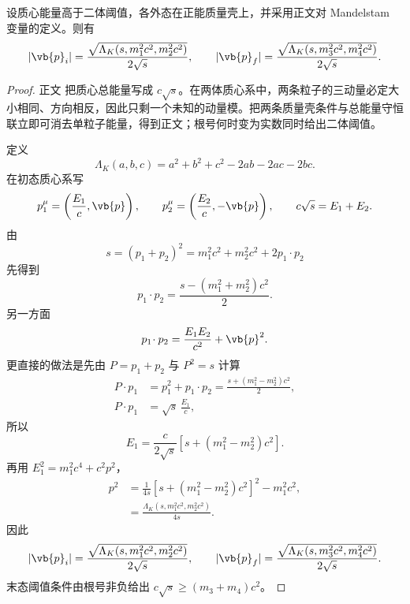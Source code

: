 \begin{proposition}
设质心能量高于二体阈值，各外态在正能质量壳上，并采用正文对 Mandelstam 变量的定义。则有
\begin{equation}
 {
 |\vb{p}_i|
 =\frac{\sqrt{\Lambda_K(s,m_1^2c^2,m_2^2c^2)}}{2\sqrt s},
 \qquad
 |\vb{p}_f|
 =\frac{\sqrt{\Lambda_K(s,m_3^2c^2,m_4^2c^2)}}{2\sqrt s}.}
\label{eq:cm-momenta-kallen-si-r9}
\end{equation}
\end{proposition}
\begin{proof}
正文 把质心总能量写成 $c\sqrt s$。在两体质心系中，两条粒子的三动量必定大小相同、方向相反，因此只剩一个未知的动量模。把两条质量壳条件与总能量守恒联立即可消去单粒子能量，得到正文；根号何时变为实数同时给出二体阈值。

定义
\begin{equation*}
 \Lambda_K(a,b,c)=a^2+b^2+c^2-2ab-2ac-2bc.
 \end{equation*}
在初态质心系写
\begin{equation*}
 p_1^\mu=\left(\frac{E_1}{c},\vb{p}\right),
 \qquad
 p_2^\mu=\left(\frac{E_2}{c},-\vb{p}\right),
 \qquad
 c\sqrt s=E_1+E_2.
\end{equation*}
由
\begin{equation*}
 s=(p_1+p_2)^2=m_1^2c^2+m_2^2c^2+2p_1\!\cdot p_2
\end{equation*}
先得到
\begin{equation*}
 p_1\!\cdot p_2
 =\frac{s-(m_1^2+m_2^2)c^2}{2}.
\end{equation*}
另一方面
\begin{equation*}
 p_1\!\cdot p_2=\frac{E_1E_2}{c^2}+\vb{p}^2.
\end{equation*}
更直接的做法是先由 $P=p_1+p_2$ 与 $P^2=s$ 计算
\begin{align*}
 P\!\cdot p_1
 &=p_1^2+p_1\!\cdot p_2
 =\frac{s+(m_1^2-m_2^2)c^2}{2},\\
 P\!\cdot p_1
 &=\sqrt s\,\frac{E_1}{c},
\end{align*}
所以
\begin{equation*}
 E_1
 =\frac{c}{2\sqrt s}
 \left[s+(m_1^2-m_2^2)c^2\right].
\end{equation*}
再用 $E_1^2=m_1^2c^4+c^2p^2$，
\begin{align*}
 p^2
 &=\frac{1}{4s}
 \left[s+(m_1^2-m_2^2)c^2\right]^2-m_1^2c^2,\\
 &=\frac{\Lambda_K(s,m_1^2c^2,m_2^2c^2)}{4s}.
\end{align*}
因此
\begin{equation*}
 {
 |\vb{p}_i|
 =\frac{\sqrt{\Lambda_K(s,m_1^2c^2,m_2^2c^2)}}{2\sqrt s},
 \qquad
 |\vb{p}_f|
 =\frac{\sqrt{\Lambda_K(s,m_3^2c^2,m_4^2c^2)}}{2\sqrt s}.}
 \end{equation*}
末态阈值条件由根号非负给出 $c\sqrt s\ge(m_3+m_4)c^2$。
\end{proof}

